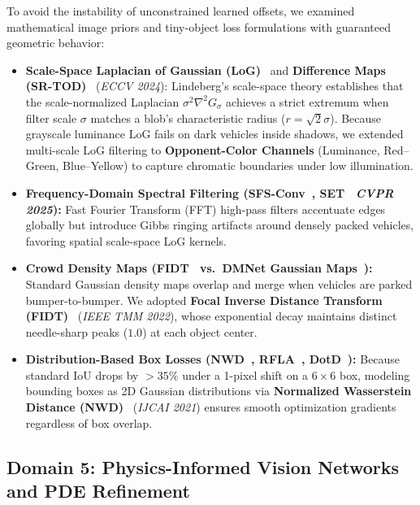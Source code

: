 \documentclass[11pt,a4paper]{article}
\begin{document}
To avoid the instability of unconstrained learned offsets, we examined mathematical image priors and tiny-object loss formulations with guaranteed geometric behavior:
\begin{itemize}[leftmargin=1.5em]
    \item \textbf{Scale-Space Laplacian of Gaussian (LoG)}~\cite{lindeberg1994scalespace} and \textbf{Difference Maps (SR-TOD)}~\cite{cao2024srtod} (\emph{ECCV 2024}): Lindeberg's scale-space theory establishes that the scale-normalized Laplacian $\sigma^2 \nabla^2 G_\sigma$ achieves a strict extremum when filter scale $\sigma$ matches a blob's characteristic radius ($r = \sqrt{2}\sigma$). Because grayscale luminance LoG fails on dark vehicles inside shadows, we extended multi-scale LoG filtering to \textbf{Opponent-Color Channels} (Luminance, Red--Green, Blue--Yellow) to capture chromatic boundaries under low illumination.
    \item \textbf{Frequency-Domain Spectral Filtering (SFS-Conv~\cite{li2024sfsconv}, SET~\cite{sun2025set} \emph{CVPR 2025}):} Fast Fourier Transform (FFT) high-pass filters accentuate edges globally but introduce Gibbs ringing artifacts around densely packed vehicles, favoring spatial scale-space LoG kernels.
    \item \textbf{Crowd Density Maps (FIDT~\cite{liang2022fidt} vs.\ DMNet Gaussian Maps~\cite{li2020dmnet}):} Standard Gaussian density maps overlap and merge when vehicles are parked bumper-to-bumper. We adopted \textbf{Focal Inverse Distance Transform (FIDT)}~\cite{liang2022fidt} (\emph{IEEE TMM 2022}), whose exponential decay maintains distinct needle-sharp peaks ($1.0$) at each object center.
    \item \textbf{Distribution-Based Box Losses (NWD~\cite{wang2021nwd}, RFLA~\cite{xu2022rfla}, DotD~\cite{xu2021dotd}):} Because standard IoU drops by $>35\%$ under a 1-pixel shift on a $6\times 6$ box, modeling bounding boxes as 2D Gaussian distributions via \textbf{Normalized Wasserstein Distance (NWD)}~\cite{wang2021nwd} (\emph{IJCAI 2021}) ensures smooth optimization gradients regardless of box overlap.
\end{itemize}

\subsection{Domain 5: Physics-Informed Vision Networks and PDE Refinement}
\end{document}
